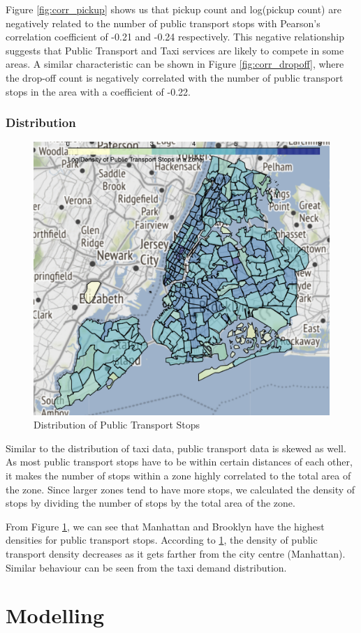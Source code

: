 \documentclass[11pt]{article}
\begin{document}
Figure \ref{fig:corr_pickup} shows us that pickup count and log(pickup count) are negatively related to the number of public transport stops with Pearson's correlation coefficient of -0.21 and -0.24 respectively. This negative relationship suggests that Public Transport and Taxi services are likely to compete in some areas. A similar characteristic can be shown in Figure \ref{fig:corr_dropoff}, where the drop-off count is negatively correlated with the number of public transport stops in the area with a coefficient of -0.22. 

\subsubsection{Distribution}

\begin{figure}[h]
  \centering
  \includegraphics[width=0.5\linewidth]{public_transport.png} 
  \caption{Distribution of Public Transport Stops}
  \label{fig:public_transport}
\end{figure}

Similar to the distribution of taxi data, public transport data is skewed as well. As most public transport stops have to be within certain distances of each other, it makes the number of stops within a zone highly correlated to the total area of the zone. Since larger zones tend to have more stops, we calculated the density of stops by dividing the number of stops by the total area of the zone.

From Figure \ref{fig:public_transport}, we can see that Manhattan and Brooklyn have the highest densities for public transport stops. According to \ref{fig:public_transport}, the density of public transport density decreases as it gets farther from the city centre (Manhattan). Similar behaviour can be seen from the taxi demand distribution. 

\section{Modelling}
\end{document}
